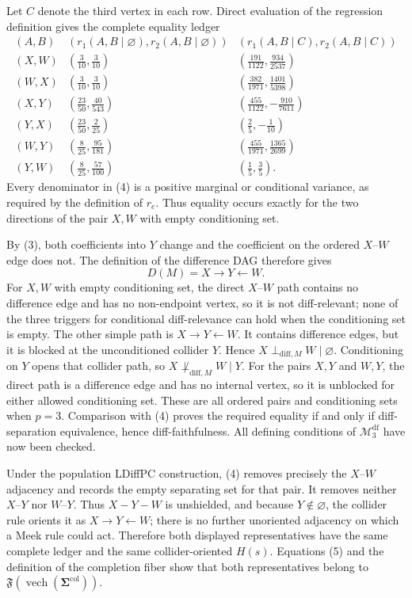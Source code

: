 Let \(C\) denote the third vertex in each row. Direct evaluation of the regression definition gives the complete equality ledger
\[
\begin{array}{c|c|c}
 (A,B)&(r_1(A,B\mid\varnothing),r_2(A,B\mid\varnothing))
 &(r_1(A,B\mid C),r_2(A,B\mid C))\\ \hline
 (X,W)&(\frac3{10},\frac3{10})&(\frac{191}{1122},\frac{934}{2537})\\
 (W,X)&(\frac3{10},\frac3{10})&(\frac{382}{1971},\frac{1401}{5398})\\
 (X,Y)&(\frac{23}{50},\frac{40}{543})&(\frac{455}{1122},-\frac{910}{7611})\\
 (Y,X)&(\frac{23}{50},\frac2{25})&(\frac25,-\frac1{10})\\
 (W,Y)&(\frac8{25},\frac{95}{181})&(\frac{455}{1971},\frac{1365}{2699})\\
 (Y,W)&(\frac8{25},\frac{57}{100})&(\frac15,\frac35).
\end{array}
\tag{4}
\]
Every denominator in (4) is a positive marginal or conditional variance, as required by the definition of \(r_e\). Thus equality occurs exactly for the two directions of the pair \(X,W\) with empty conditioning set.

By (3), both coefficients into \(Y\) change and the coefficient on the ordered \(X\)--\(W\) edge does not. The definition of the difference DAG therefore gives
\[
 D(M)=X\longrightarrow Y\longleftarrow W.
 \tag{5}
\]
For \(X,W\) with empty conditioning set, the direct \(X\)--\(W\) path contains no difference edge and has no non-endpoint vertex, so it is not diff-relevant; none of the three triggers for conditional diff-relevance can hold when the conditioning set is empty. The other simple path is \(X\to Y\leftarrow W\). It contains difference edges, but it is blocked at the unconditioned collider \(Y\). Hence \(X\perp_{\mathrm{diff},M}W\mid\varnothing\). Conditioning on \(Y\) opens that collider path, so \(X\not\perp_{\mathrm{diff},M}W\mid Y\). For the pairs \(X,Y\) and \(W,Y\), the direct path is a difference edge and has no internal vertex, so it is unblocked for either allowed conditioning set. These are all ordered pairs and conditioning sets when \(p=3\). Comparison with (4) proves the required equality if and only if diff-separation equivalence, hence diff-faithfulness. All defining conditions of \(\mathcal M_3^{\mathrm{df}}\) have now been checked.

Under the population LDiffPC construction, (4) removes precisely the \(X\)--\(W\) adjacency and records the empty separating set for that pair. It removes neither \(X\)--\(Y\) nor \(W\)--\(Y\). Thus \(X-Y-W\) is unshielded, and because \(Y\notin\varnothing\), the collider rule orients it as \(X\to Y\leftarrow W\); there is no further unoriented adjacency on which a Meek rule could act. Therefore both displayed representatives have the same complete ledger and the same collider-oriented \(H(s)\). Equations (5) and the definition of the completion fiber show that both representatives belong to \(\mathfrak F(\operatorname{vech}(\boldsymbol\Sigma^{\mathrm{col}}))\).

